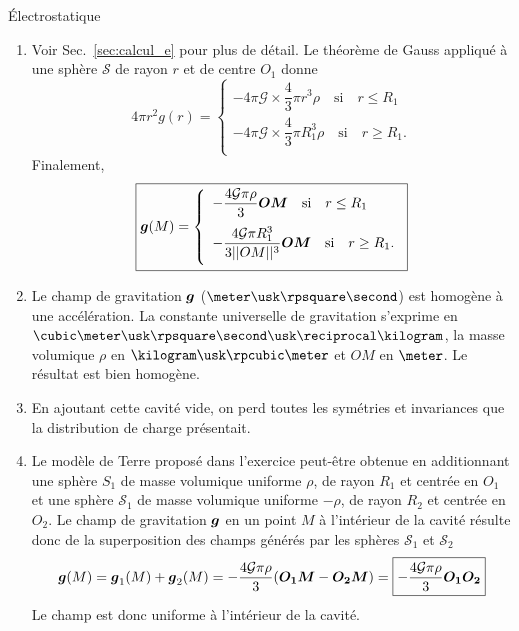 \begin{corr}{Électrostatique}
\begin{enumerate}
\item Voir Sec.~\ref{sec:calcul_e} pour plus de détail. Le théorème de Gauss appliqué
	à une sphère $\mathcal{S}$ de rayon $r$ et de centre $O_1$ donne
	\begin{equation*}
		4 \pi r^2 g(r) =
		\left\{
		\begin{array}{l}
			- 4 \pi \mathcal{G}\times \dfrac{4}{3} \pi r^3 \rho 
			\quad \mathrm{si} \quad r \leq R_1 \\[1em]
			- 4 \pi \mathcal{G} \times \dfrac{4}{3} \pi R_1^3 \rho
			\quad \mathrm{si} \quad r \geq R_1. \\[1em]
		\end{array}
		\right.
	\end{equation*}
	Finalement,
	\begin{equation*}
		\boxed{
		\vecg(M) =
		\left\{
		\begin{array}{l}
			- \dfrac{4\mathcal{G} \pi\rho}{3}  \mitbf{OM}
			\quad \mathrm{si} \quad r \leq R_1 \\[1em]
			- \dfrac{4\mathcal{G} \pi R_1^3}{3||OM||^3}  \mitbf{OM} 
			\quad \mathrm{si} \quad r \geq R_1. \\[1em]
		\end{array}
		\right.
		}
	\end{equation*}

\item Le champ de gravitation $\vecg$ ($\meter \usk \rpsquare \second$)
      est homogène à une accélération.
      La constante universelle de gravitation s'exprime en $
      \cubic \meter \usk \rpsquare \second \usk \reciprocal \kilogram$, la masse volumique
      $\rho$ en $\kilogram \usk \rpcubic \meter$ et $OM$ en $\meter$. Le résultat
      est bien homogène.

      \item En ajoutant cette cavité vide, on perd toutes les symétries et invariances
	    que la distribution de charge présentait. 

      \item Le modèle de Terre proposé dans l'exercice peut-être obtenue en 
	    additionnant une sphère $S_1$ de masse volumique uniforme $\rho$, de rayon
	    $R_1$ et centrée en $O_1$ et une sphère $\mathcal{S}_1$ de masse volumique
	    uniforme $-\rho$, de rayon $R_2$ et centrée en $O_2$. Le champ de 
	    gravitation $\vecg$ en un point $M$ à l'intérieur de la cavité résulte donc
	    de la superposition des champs générés par les sphères $\mathcal{S}_1$
	    et $\mathcal{S}_2$
	    \begin{equation*}
		    \vecg(M) = \vecg_1(M) + \vecg_2(M) = 
	    -\dfrac{4 \mathcal{G} \pi \rho}{3} (\mitbf{O_1M} - \mitbf{O_2M}) =
	    \boxed{-\dfrac{4 \mathcal{G} \pi \rho}{3} \mitbf{O_1 O_2}}
	    \end{equation*}
	    Le champ est donc uniforme à l'intérieur de la cavité.
	\end{enumerate}



\end{corr}

